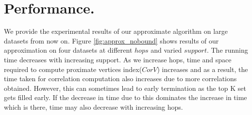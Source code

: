 
\section{Performance.}
We provide the experimental results of our approximate algorithm on large datasets from now on. 
\newline
\newline
{} Figure \ref{fig:approx_nobound} shows results of our approximation on four datasets at different $hops$ and varied $support$. The running time decreases with increasing support. As we increase hops, time and space required to compute proximate vertices index($CorV$) increases and as a result, the time taken for correlation computation also increases due to more correlations obtained. However, this can  sometimes lead to early termination as the top K set gets filled early. If the decrease in time due to this dominates the increase in time which is there, time may also decrease with increasing hops.


